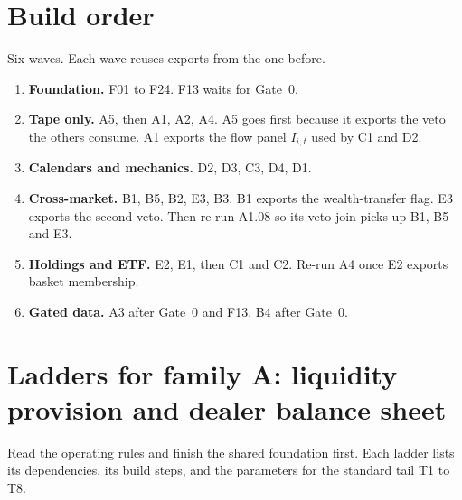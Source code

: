 \documentclass[11pt,letterpaper]{article}
\begin{document}
\section{Build order}
Six waves. Each wave reuses exports from the one before.
\begin{enumerate}[itemsep=2pt]
\item \textbf{Foundation.} F01 to F24. F13 waits for Gate~0.
\item \textbf{Tape only.} A5, then A1, A2, A4. A5 goes first because it exports the veto the others consume. A1 exports the flow panel $I_{i,t}$ used by C1 and D2.
\item \textbf{Calendars and mechanics.} D2, D3, C3, D4, D1.
\item \textbf{Cross-market.} B1, B5, B2, E3, B3. B1 exports the wealth-transfer flag. E3 exports the second veto. Then re-run A1.08 so its veto join picks up B1, B5 and E3.
\item \textbf{Holdings and ETF.} E2, E1, then C1 and C2. Re-run A4 once E2 exports basket membership.
\item \textbf{Gated data.} A3 after Gate~0 and F13. B4 after Gate~0.
\end{enumerate}
\section{Ladders for family A: liquidity provision and dealer balance sheet}
\label{sec:laddersA}
Read the operating rules and finish the shared foundation first. Each ladder lists its dependencies, its build steps, and the parameters for the standard tail T1 to T8.
\end{document}
